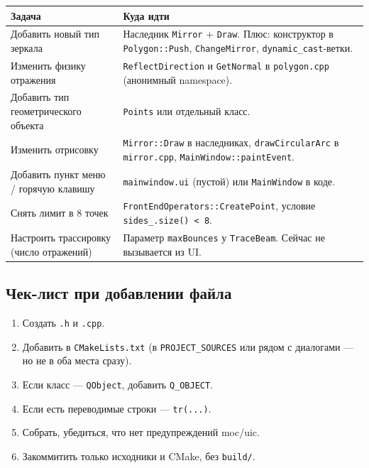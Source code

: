 \documentclass[a4paper,11pt]{article}
\newcommand{\file}[1]{\texttt{#1}}
\newcommand{\code}[1]{\texttt{#1}}
\begin{document}
\begin{longtable}{@{}p{6cm}p{9cm}@{}}
\toprule
\textbf{Задача} & \textbf{Куда идти} \\ \midrule
\endhead
Добавить новый тип зеркала &
Наследник \code{Mirror} + \code{Draw}. Плюс: конструктор в
\code{Polygon::Push}, \code{ChangeMirror}, \code{dynamic\_cast}-ветки. \\
\addlinespace
Изменить физику отражения &
\code{ReflectDirection} и \code{GetNormal} в \file{polygon.cpp}
(анонимный namespace). \\
\addlinespace
Добавить тип геометрического объекта &
\code{Points} или отдельный класс. \\
\addlinespace
Изменить отрисовку &
\code{Mirror::Draw} в наследниках, \code{drawCircularArc} в
\file{mirror.cpp}, \code{MainWindow::paintEvent}. \\
\addlinespace
Добавить пункт меню / горячую клавишу &
\code{mainwindow.ui} (пустой) или \code{MainWindow} в коде. \\
\addlinespace
Снять лимит в 8 точек &
\code{FrontEndOperators::CreatePoint}, условие
\code{sides\_.size() < 8}. \\
\addlinespace
Настроить трассировку (число отражений) &
Параметр \code{maxBounces} у \code{TraceBeam}. Сейчас не вызывается
из UI. \\
\bottomrule
\end{longtable}

\subsection{Чек-лист при добавлении файла}

\begin{enumerate}[leftmargin=*]
    \item Создать \file{.h} и \file{.cpp}.
    \item Добавить в \code{CMakeLists.txt} (в \code{PROJECT\_SOURCES}
          или рядом с диалогами — но не в оба места сразу).
    \item Если класс — \code{QObject}, добавить \code{Q\_OBJECT}.
    \item Если есть переводимые строки — \code{tr(...)}.
    \item Собрать, убедиться, что нет предупреждений moc/uic.
    \item Закоммитить только исходники и CMake, без \file{build/}.
\end{enumerate}

\end{document}
